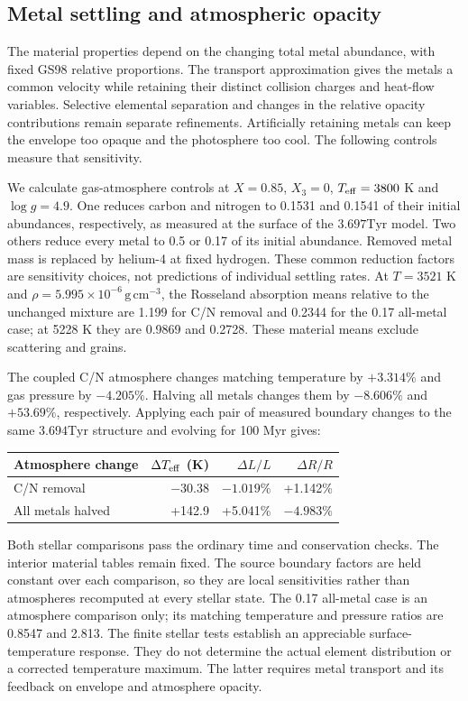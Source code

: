 \documentclass[11pt,letterpaper]{article}
\newcommand{\Tyr}{\mathrm{Tyr}}
\begin{document}
\subsection{Metal settling and atmospheric opacity}
The material properties depend on the changing total metal abundance,
with fixed GS98 relative proportions. The transport approximation gives the
metals a common velocity while retaining their distinct collision charges
and heat-flow variables. Selective elemental separation and changes in the
relative opacity contributions remain separate refinements. Artificially
retaining metals can keep the envelope too opaque and the photosphere too
cool. The following controls measure that sensitivity.

We calculate gas-atmosphere controls at $X=0.85$, $X_3=0$,
$T_{\rm eff}=3800$ K and $\log g=4.9$. One reduces carbon and nitrogen
to 0.1531 and 0.1541 of their initial abundances, respectively, as measured
at the surface of the $3.697\Tyr$ model. Two others reduce every metal to
0.5 or 0.17 of its initial abundance. Removed metal mass is replaced by
helium-4 at fixed hydrogen. These common reduction factors are sensitivity
choices, not predictions of individual settling rates. At
$T=3521$ K and $\rho=5.995\times10^{-6}\,\mathrm{g\,cm^{-3}}$, the
Rosseland absorption means relative to the unchanged mixture are 1.199
for C/N removal and 0.2344 for the 0.17 all-metal case; at 5228 K they
are 0.9869 and 0.2728. These material means exclude scattering and grains.

The coupled C/N atmosphere changes matching temperature by $+3.314\%$
and gas pressure by $-4.205\%$. Halving all metals changes them by
$-8.606\%$ and $+53.69\%$, respectively. Applying each pair of measured
boundary changes to the same $3.694\Tyr$ structure and evolving for
100 Myr gives:
\begin{center}\begin{tabular}{@{}lrrr@{}}\toprule
Atmosphere change & $\Delta T_{\rm eff}$ (K) & $\Delta L/L$ & $\Delta R/R$ \\\midrule
C/N removal & $-30.38$ & $-1.019\%$ & +1.142\% \\
All metals halved & +142.9 & +5.041\% & $-4.983\%$ \\\bottomrule
\end{tabular}\end{center}
Both stellar comparisons pass the ordinary time and conservation checks.
The interior material tables remain fixed. The source boundary factors are
held constant over each comparison, so they are local sensitivities rather
than atmospheres recomputed at every stellar state. The 0.17 all-metal case
is an atmosphere comparison only; its matching temperature and pressure
ratios are 0.8547 and 2.813. The finite stellar tests establish an appreciable
surface-temperature response. They do not determine the actual element
distribution or a corrected temperature maximum. The latter requires metal
transport and its feedback on envelope and atmosphere opacity.
\end{document}
